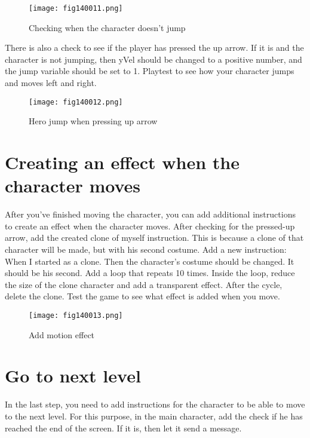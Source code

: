 \begin{figure}[H]
   \centering
   \texttt{[image: fig140011.png]}
   \caption{Checking when the character doesn't jump}
\label{fig140011}
\end{figure}

There is also a check to see if the player has pressed the up arrow. If it is and the character is not jumping, then yVel should be changed to a positive number, and the jump variable should be set to 1. Playtest to see how your character jumps and moves left and right.

\begin{figure}[H]
   \centering
   \texttt{[image: fig140012.png]}
   \caption{Hero jump when pressing up arrow}
\label{fig140012}
\end{figure}

\section{Creating an effect when the character moves}

After you've finished moving the character, you can add additional instructions to create an effect when the character moves. After checking for the pressed-up arrow, add the created clone of myself instruction. This is because a clone of that character will be made, but with his second costume. Add a new instruction: When I started as a clone. Then the character's costume should be changed. It should be his second. Add a loop that repeats 10 times. Inside the loop, reduce the size of the clone character and add a transparent effect. After the cycle, delete the clone. Test the game to see what effect is added when you move.

\begin{figure}[H]
   \centering
   \texttt{[image: fig140013.png]}
   \caption{Add motion effect}
\label{fig140013}
\end{figure}

\section{Go to next level}

In the last step, you need to add instructions for the character to be able to move to the next level. For this purpose, in the main character, add the check if he has reached the end of the screen. If it is, then let it send a message.


